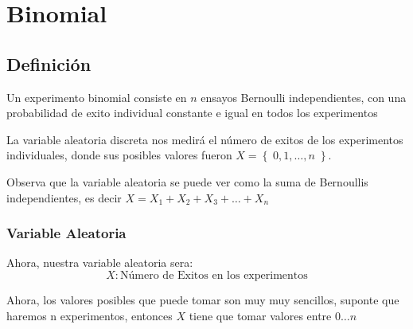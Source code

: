 \documentclass[12pt, fleqn]{report}                             %
\theoremstyle{break}                                            %
\newcommand{\Set}[1]            {\left\{ \; #1 \; \right\}}     %
\begin{document}
        \clearpage
        \section{Binomial}

            \subsection{Definición}

                Un experimento binomial consiste en $n$ ensayos Bernoulli
                independientes, con una probabilidad de exito individual constante e igual en 
                todos los experimentos

                La variable aleatoria discreta nos medirá el número de exitos de los experimentos individuales,
                donde sus posibles valores fueron $X = \Set{0, 1, \dots, n}$.

                Observa que la variable aleatoria se puede ver como la suma de Bernoullis independientes,
                es decir $X = X_1 + X_2 + X_3 + \dots + X_n$

                \vspace{1em}
                \subsubsection{Variable Aleatoria}

                    Ahora, nuestra variable aleatoria sera:
                    \begin{equation*}
                        X : \text{Número de Exitos en los experimentos}
                    \end{equation*}

                    Ahora, los valores posibles que puede tomar son muy muy sencillos, suponte que haremos
                    n experimentos, entonces $X$ tiene que tomar valores entre $0 \dots n$
\end{document}
